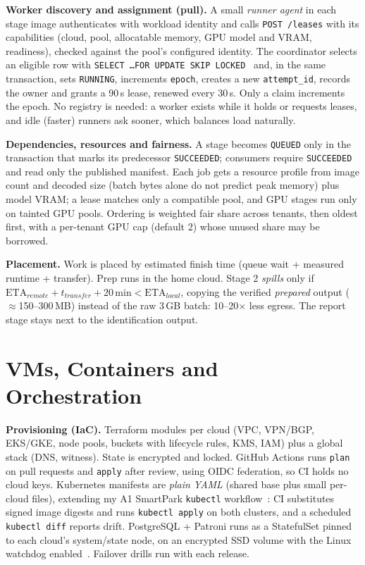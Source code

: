 \documentclass[10pt,a4paper]{article}
\begin{document}
\textbf{Worker discovery and assignment (pull).} A small \emph{runner agent} in each stage image
authenticates with workload identity and calls \texttt{POST /leases} with its capabilities (cloud, pool,
allocatable memory, GPU model and VRAM, readiness), checked against the pool's configured identity. The
coordinator selects an eligible row with \texttt{SELECT \ldots FOR UPDATE SKIP LOCKED}~\cite{pg-select} and, in
the same transaction, sets \texttt{RUNNING}, increments \texttt{epoch}, creates a new \texttt{attempt\_id},
records the owner and grants a 90\,s lease, renewed every 30\,s. Only a claim increments the epoch. No
registry is needed: a worker exists while it holds or requests leases, and idle (faster) runners ask
sooner, which balances load naturally.

\textbf{Dependencies, resources and fairness.} A stage becomes \texttt{QUEUED} only in the transaction that
marks its predecessor \texttt{SUCCEEDED}; consumers require \texttt{SUCCEEDED} and read only the published
manifest. Each job gets a resource profile from image count and decoded size (batch bytes alone do not
predict peak memory) plus model VRAM; a lease matches only a compatible pool, and GPU stages run only on
tainted GPU pools. Ordering is weighted fair share across tenants, then oldest first, with a per-tenant
GPU cap (default 2) whose unused share may be borrowed.

\textbf{Placement.} Work is placed by estimated finish time (queue wait + measured runtime + transfer).
Prep runs in the home cloud. Stage 2 \emph{spills} only if
$\mathrm{ETA}_{remote} + t_{transfer} + 20\,\mathrm{min} < \mathrm{ETA}_{local}$, copying the verified
\emph{prepared} output ($\approx$150--300\,MB) instead of the raw 3\,GB batch: 10--20$\times$ less egress. The
report stage stays next to the identification output.

\section{VMs, Containers and Orchestration}
\textbf{Provisioning (IaC).} Terraform modules per cloud (VPC, VPN/BGP, EKS/GKE, node pools, buckets with
lifecycle rules, KMS, IAM) plus a global stack (DNS, witness). State is encrypted and locked. GitHub
Actions runs \texttt{plan} on pull requests and \texttt{apply} after review, using OIDC federation, so CI
holds no cloud keys. Kubernetes manifests are \emph{plain YAML} (shared base plus small per-cloud files),
extending my A1 SmartPark \texttt{kubectl} workflow~\cite{smartpark}: CI substitutes signed image digests and
runs \texttt{kubectl apply} on both clusters, and a scheduled \texttt{kubectl diff} reports drift.
PostgreSQL + Patroni runs as a StatefulSet pinned to each cloud's system/state node, on an encrypted SSD
volume with the Linux watchdog enabled~\cite{patroni-watchdog}. Failover drills run with each release.
\end{document}
